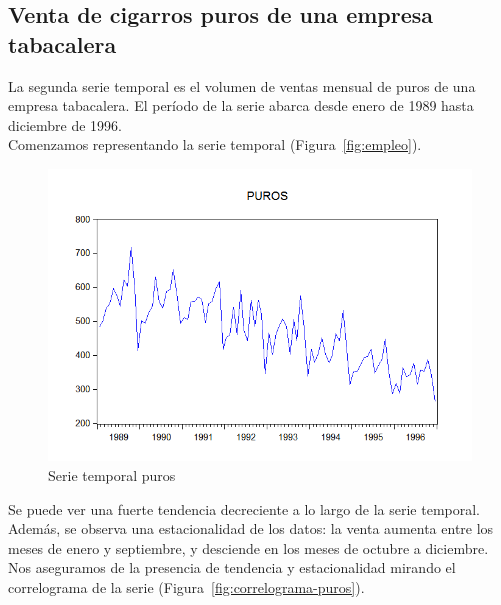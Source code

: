 \documentclass[12pt,a4paper,twoside,openright,titlepage,final]{article}
\begin{document}
\clearpage

\subsection{Venta de cigarros puros de una empresa tabacalera}

La segunda serie temporal es el volumen de ventas mensual de puros de una empresa tabacalera. El período de la serie abarca desde enero de 1989 hasta diciembre de 1996.\\

Comenzamos representando la serie temporal (Figura~\ref{fig:empleo}).\\

\begin{figure}[tbph!]
	\centering
	\includegraphics[width=0.8\linewidth]{imagenes/puros/puros.png}
	\caption{Serie temporal puros}
	\label{fig:puros}
\end{figure} 

Se puede ver una fuerte tendencia decreciente a lo largo de la serie temporal. Además, se observa una estacionalidad de los datos: la venta aumenta entre los meses de enero y septiembre, y desciende en los meses de octubre a diciembre.\\

Nos aseguramos de la presencia de tendencia y estacionalidad mirando el correlograma de la serie (Figura~\ref{fig:correlograma-puros}).\\
\end{document}
